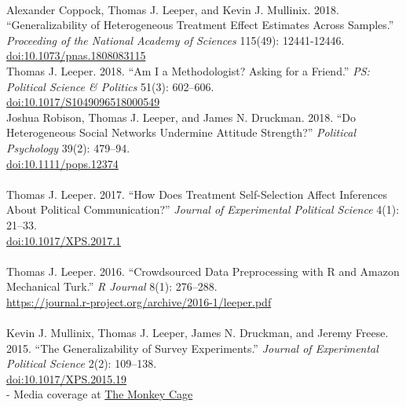 \documentclass[12pt]{article}
\newcommand{\topic}[1]{\pagebreak[3]\indent {\color{lg}{\footnotesize #1 }}\\}
\newcommand{\entry}[1]{\indent {\color{lg}\guillemotright}\hspace{2pt}#1\vspace{.25em}\\}
\newcommand{\subentry}[1]{{\color{lg}-} #1\vspace{.25em}\\}
\begin{document}
\topic{Peer-Reviewed Publications: 2018}
    \entry{Alexander Coppock, Thomas J. Leeper, and Kevin J. Mullinix. 2018. ``Generalizability of Heterogeneous Treatment Effect Estimates Across Samples.'' \textit{Proceeding of the National Academy of Sciences} 115(49): 12441-12446.\\ \href{https://doi.org/10.1073/pnas.1808083115}{doi:10.1073/pnas.1808083115}}
	\entry{Thomas J. Leeper. 2018. ``Am I a Methodologist? Asking for a Friend.'' \textit{PS: Political Science \& Politics} 51(3): 602--606.\\ \href{https://doi.org/10.1017/S1049096518000549}{doi:10.1017/S1049096518000549}}
	\entry{Joshua Robison, Thomas J. Leeper, and James N. Druckman. 2018. ``Do Heterogeneous Social Networks Undermine Attitude Strength?'' \textit{Political Psychology} 39(2): 479--94.\\ \href{http://doi.org/10.1111/pops.12374}{doi:10.1111/pops.12374}}

\topic{Peer-Reviewed Publications: 2017}
    \entry{Thomas J. Leeper. 2017. ``How Does Treatment Self-Selection Affect Inferences About Political Communication?'' \textit{Journal of Experimental Political Science} 4(1): 21--33.\\ \href{http://doi.org/10.1017/XPS.2017.1}{doi:10.1017/XPS.2017.1}}

\topic{Peer-Reviewed Publications: 2016}
	\entry{Thomas J. Leeper. 2016. ``Crowdsourced Data Preprocessing with R and Amazon Mechanical Turk.'' \textit{R Journal} 8(1): 276--288.\\ \href{https://journal.r-project.org/archive/2016-1/leeper.pdf}{https://journal.r-project.org/archive/2016-1/leeper.pdf}}

\topic{Peer-Reviewed Publications: 2015}
	\entry{Kevin J. Mullinix, Thomas J. Leeper, James N. Druckman, and Jeremy Freese. 2015. ``The Generalizability of Survey Experiments.'' \textit{Journal of Experimental Political Science} 2(2): 109--138.\\ \href{http://doi.org/10.1017/XPS.2015.19}{doi:10.1017/XPS.2015.19}}
		\subentry{Media coverage at \href{https://www.washingtonpost.com/news/monkey-cage/wp/2016/03/09/does-social-science-have-a-replication-crisis/}{The Monkey Cage}}
\end{document}

